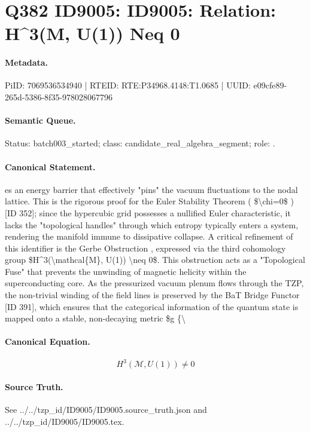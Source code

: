 \section*{Q382 ID9005: ID9005: Relation: H\textasciicircum{}3(M, U(1)) Neq 0}
\paragraph{Metadata.}
PiID: 7069536534940 | RTEID: RTE:P34968.4148:T1.0685 | UUID: e09cfe89-265d-5386-8f35-978028067796

\paragraph{Semantic Queue.}
Status: batch003\_started; class: candidate\_real\_algebra\_segment; role: .

\paragraph{Canonical Statement.}
es an energy barrier that effectively "pins" the vacuum fluctuations to the nodal lattice. This is the rigorous proof for the Euler Stability Theorem ( \$\textbackslash{}chi=0\$ ) [ID 352]; since the hypercubic grid possesses a nullified Euler characteristic, it lacks the "topological handles" through which entropy typically enters a system, rendering the manifold immune to dissipative collapse. A critical refinement of this identifier is the Gerbe Obstruction , expressed via the third cohomology group \$H\textasciicircum{}3(\textbackslash{}mathcal\{M\}, U(1)) \textbackslash{}neq 0\$. This obstruction acts as a "Topological Fuse" that prevents the unwinding of magnetic helicity within the superconducting core. As the pressurized vacuum plenum flows through the TZP, the non-trivial winding of the field lines is preserved by the BaT Bridge Functor [ID 391], which ensures that the categorical information of the quantum state is mapped onto a stable, non-decaying metric \$g \{\textbackslash{}

\paragraph{Canonical Equation.}
\[
H^3(\mathcal{M}, U(1)) \neq 0
\]

\paragraph{Source Truth.}
See ../../tzp\_id/ID9005/ID9005.source\_truth.json and ../../tzp\_id/ID9005/ID9005.tex.

